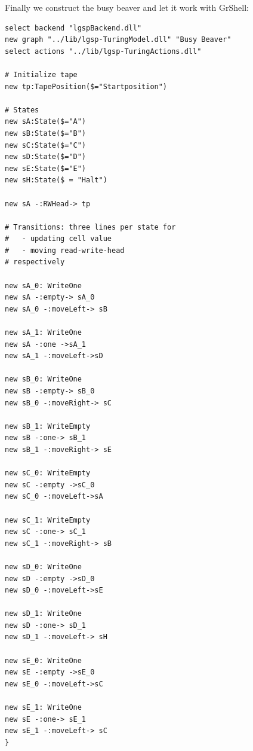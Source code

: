 \documentclass[a4paper,11pt]{report}
\begin{document}
Finally we construct the busy beaver and let it work with GrShell:
\lstset{language=grshell}
\begin{lstlisting}[name=bb] 
select backend "lgspBackend.dll"
new graph "../lib/lgsp-TuringModel.dll" "Busy Beaver"
select actions "../lib/lgsp-TuringActions.dll"

# Initialize tape
new tp:TapePosition($="Startposition")

# States
new sA:State($="A")
new sB:State($="B")
new sC:State($="C")
new sD:State($="D")
new sE:State($="E")
new sH:State($ = "Halt")

new sA -:RWHead-> tp

# Transitions: three lines per state for
#   - updating cell value
#   - moving read-write-head
# respectively

new sA_0: WriteOne
new sA -:empty-> sA_0
new sA_0 -:moveLeft-> sB

new sA_1: WriteOne
new sA -:one ->sA_1
new sA_1 -:moveLeft->sD

new sB_0: WriteOne
new sB -:empty-> sB_0
new sB_0 -:moveRight-> sC

new sB_1: WriteEmpty
new sB -:one-> sB_1
new sB_1 -:moveRight-> sE

new sC_0: WriteEmpty
new sC -:empty ->sC_0
new sC_0 -:moveLeft->sA

new sC_1: WriteEmpty
new sC -:one-> sC_1
new sC_1 -:moveRight-> sB

new sD_0: WriteOne
new sD -:empty ->sD_0
new sD_0 -:moveLeft->sE

new sD_1: WriteOne
new sD -:one-> sD_1
new sD_1 -:moveLeft-> sH

new sE_0: WriteOne
new sE -:empty ->sE_0
new sE_0 -:moveLeft->sC

new sE_1: WriteOne
new sE -:one-> sE_1
new sE_1 -:moveLeft-> sC
}      
\end{lstlisting}
\end{document}
